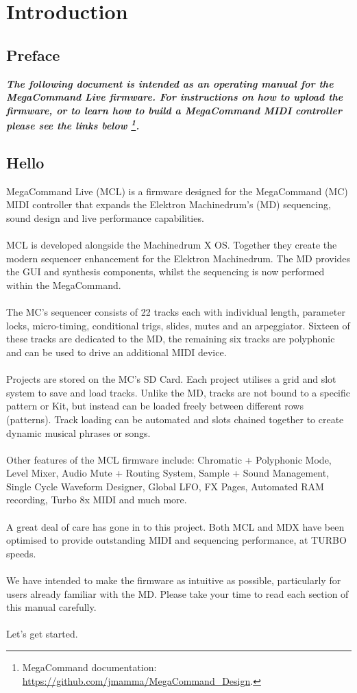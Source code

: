 \chapter{Introduction}
\section{Preface}
\begin{small}
\textbf{\textit{The following document is intended as an operating manual for the MegaCommand Live firmware. For instructions on how to upload the firmware, or to learn how to build a MegaCommand MIDI controller please see the links below \footnote{MegaCommand documentation: \url{https://github.com/jmamma/MegaCommand_Design}.}.}}
\end{small}

\section{Hello}
MegaCommand Live (MCL) is a firmware designed for the MegaCommand (MC) MIDI controller that expands the Elektron Machinedrum's (MD) sequencing, sound design and live performance capabilities. 
\\
\\
MCL is developed alongside the Machinedrum X OS. Together they create the modern sequencer enhancement for the Elektron Machinedrum. The MD provides the GUI and synthesis components, whilst the sequencing is now performed within the MegaCommand.
\\
\\
The MC's sequencer consists of 22 tracks each with individual length, parameter locks, micro-timing, conditional trigs, slides, mutes and an arpeggiator. Sixteen of these tracks are dedicated to the MD, the remaining six tracks are polyphonic and can be used to drive an additional MIDI device.
\\
\\
Projects are stored on the MC's SD Card. Each project utilises a grid and slot system to save and load tracks. Unlike the MD, tracks are not bound to a specific pattern or Kit, but instead can be loaded freely between different rows (patterns). Track loading can be automated and slots chained together to create dynamic musical phrases or songs. 
\\
\\
Other features of the MCL firmware include: Chromatic + Polyphonic Mode,  Level Mixer, Audio Mute + Routing System, Sample + Sound Management, Single Cycle Waveform Designer, Global LFO, FX Pages, Automated RAM recording, Turbo 8x MIDI and much more.
\\
\\
A great deal of care has gone in to this project. Both MCL and MDX have been optimised to provide outstanding MIDI and sequencing performance, at TURBO speeds.
\\
\\
We have intended to make the firmware as intuitive as possible, particularly for users already familiar with the MD. Please take your time to read each section of this manual carefully. 
\\
\\
Let's get started.
